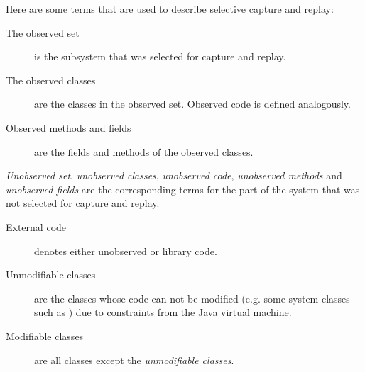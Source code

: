 Here are some terms that are used to describe selective capture and replay:
\begin{description}
	\item [The observed set] is the subsystem that was selected for capture and replay.
	\item [The observed classes] are the classes in the observed set. Observed code is defined analogously.
	\item [Observed methods and fields] are the fields and methods of the observed classes.
\end{description}
\emph{Unobserved set},  \emph{unobserved classes}, \emph{unobserved code}, \emph{unobserved methods} and \emph{unobserved fields} are the corresponding terms for the part of the system that was not selected for capture and replay.
\begin{description}
	\item [External code] denotes either unobserved or library code.
	\item [Unmodifiable classes] are the classes whose code can not be modified (e.g. some system classes such as ) due to constraints from the Java virtual machine.
	\item [Modifiable classes] are all classes except the \emph{unmodifiable classes}.
\end{description}

